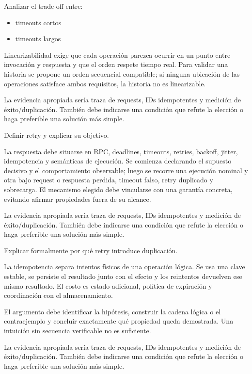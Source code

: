 \documentclass[variant=guia,cover=institutional,mode=screen]{ua-engineering-v6-article}
\begin{document}
\begin{uaexercise}
Analizar el trade-off entre:
\begin{itemize}
\item timeouts cortos
\item timeouts largos
\end{itemize}
\end{uaexercise}
\begin{uaanswer}
Linearizabilidad exige que cada operación parezca ocurrir en un punto entre invocación y respuesta y que el orden respete tiempo real. Para validar una historia se propone un orden secuencial compatible; si ninguna ubicación de las operaciones satisface ambos requisitos, la historia no es linearizable.

La evidencia apropiada sería traza de requests, IDs idempotentes y medición de éxito/duplicación. También debe indicarse una condición que refute la elección o haga preferible una solución más simple.
\end{uaanswer}

\begin{uaexercise}
Definir retry y explicar su objetivo.
\end{uaexercise}
\begin{uaanswer}
La respuesta debe situarse en RPC, deadlines, timeouts, retries, backoff, jitter, idempotencia y semánticas de ejecución. Se comienza declarando el supuesto decisivo y el comportamiento observable; luego se recorre una ejecución nominal y otra bajo request o respuesta perdida, timeout falso, retry duplicado y sobrecarga. El mecanismo elegido debe vincularse con una garantía concreta, evitando afirmar propiedades fuera de su alcance.

La evidencia apropiada sería traza de requests, IDs idempotentes y medición de éxito/duplicación. También debe indicarse una condición que refute la elección o haga preferible una solución más simple.
\end{uaanswer}

\begin{uaexercise}
Explicar formalmente por qué retry introduce duplicación.
\end{uaexercise}
\begin{uaanswer}
La idempotencia separa intentos físicos de una operación lógica. Se usa una clave estable, se persiste el resultado junto con el efecto y los reintentos devuelven ese mismo resultado. El costo es estado adicional, política de expiración y coordinación con el almacenamiento.

El argumento debe identificar la hipótesis, construir la cadena lógica o el contraejemplo y concluir exactamente qué propiedad queda demostrada. Una intuición sin secuencia verificable no es suficiente.

La evidencia apropiada sería traza de requests, IDs idempotentes y medición de éxito/duplicación. También debe indicarse una condición que refute la elección o haga preferible una solución más simple.
\end{uaanswer}
\end{document}
